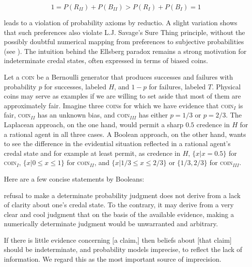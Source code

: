 \begin{equation}
  \label{eq:s1}
  1=P(R_{II})+P(B_{II})>P(R_{I})+P(B_{I})=1
\end{equation}

leads to a violation of probability axioms by reductio. A slight variation shows that such preferences also violate L.J. Savage's Sure Thing principle, without the possibly doubtful numerical mapping from preferences to subjective probabilities (see ). The intuition behind the Ellsberg paradox remains a strong motivation for indeterminate credal states, often expressed in terms of biased coins.

Let a \textsc{coin} be a Bernoulli generator that produces successes and failures with probability $p$ for successes, labeled $H$, and $1-p$ for failures, labeled $T$. Physical coins may serve as examples if we are willing to set aside that most of them are approximately fair. Imagine three \textsc{coin}s for which we have evidence that \textsc{coin}$_{I}$ is fair, \textsc{coin}$_{II}$ has an unknown bias, and \textsc{coin}$_{III}$ has either $p=1/3$ or $p=2/3$. The Laplacean approach, on the one hand, would permit a sharp $0.5$ credence in $H$ for a rational agent in all three cases. A Boolean approach, on the other hand, wants to see the difference in the evidential situation reflected in a rational agent's credal state and for example at least permit, as credence in $H$, $\{x|x=0.5\}$ for \textsc{coin}$_{I}$, $\{x|0\leq{}x\leq{}1\}$ for \textsc{coin}$_{II}$, and $\{x|1/3\leq{}x\leq{}2/3\}$ or $\{1/3,2/3\}$ for \textsc{coin}$_{III}$.

Here are a few concise statements by Booleans:

\begin{quotex}
  [A] refusal to make a determinate probability judgment does not derive from a lack of clarity about one's credal state. To the contrary, it may derive from a very clear and cool judgment that on the basis of the available evidence, making a numerically determinate judgment would be unwarranted and arbitrary. 
\end{quotex}

\begin{quotex}
  If there is little evidence concerning [a claim,] then beliefs about [that claim] should be indeterminate, and probability models imprecise, to reflect the lack of information. We regard this as the most important source of imprecision. 
\end{quotex}

